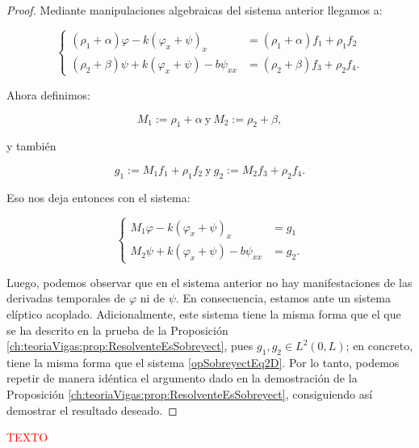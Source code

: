 \begin{proof}
    Mediante manipulaciones algebraicas del sistema anterior llegamos a:

    \begin{equation}
        \label{opSobreyectEq2DAmort}
        \begin{cases}
            (\rho_1 + \alpha)\varphi - k(\varphi_x + \psi)_x &= (\rho_1+\alpha)f_1 + \rho_1f_2\\
            (\rho_2+\beta)\psi + k(\varphi_x + \psi) - b\psi_{xx} &= (\rho_2 + \beta)f_3 + \rho_2f_4.
        \end{cases}
    \end{equation}

    Ahora definimos:

    \[M_1 := \rho_1 + \alpha \ \text{y} \ M_2 := \rho_2 + \beta,\]

    y también

    \[g_1 := M_1f_1 + \rho_1f_2 \ \text{y} \ g_2 := M_2f_3 + \rho_2f_4.\]

    Eso nos deja entonces con el sistema:

    \begin{equation*}
        \begin{cases}
            M_1\varphi - k(\varphi_x + \psi)_x &= g_1\\
            M_2\psi + k(\varphi_x + \psi) - b\psi_{xx} &= g_2.
        \end{cases}
    \end{equation*}
    
    Luego, podemos observar que en el sistema anterior no hay manifestaciones de las derivadas temporales de $\varphi$ ni de $\psi$. En consecuencia, estamos ante un sistema elíptico acoplado. Adicionalmente, este sistema tiene la misma forma que el que se ha descrito en la prueba de la Proposición \ref{ch:teoriaVigas:prop:ResolventeEsSobreyect}, pues $g_1, g_2 \in L^2(0,L)$; en concreto, tiene la misma forma que el sistema \eqref{opSobreyectEq2D}. Por lo tanto, podemos repetir de manera idéntica el argumento dado en la demostración de la Proposición \ref{ch:teoriaVigas:prop:ResolventeEsSobreyect}, consiguiendo así demostrar el resultado deseado.
\end{proof}

\textcolor{red}{TEXTO}

